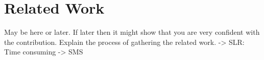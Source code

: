 \chapter{Related Work}
May be here or later. If later then it might show that you are very confident with the contribution. Explain the process of gathering the related work.
-> SLR: Time consuming
-> SMS